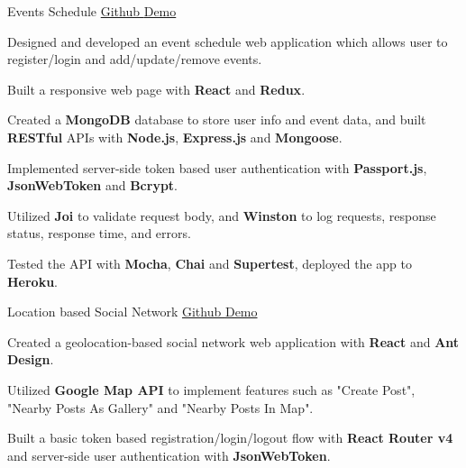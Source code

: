 \begin{cvprojects}
  \cvproject
    {Events Schedule}
    {\href{https://github.com/wuhxxx/event-schedule}{Github  }}
    {\href{https://event-schedule-app.herokuapp.com}{  Demo}}
    {
      \begin{cvitems}
        \item {Designed and developed an event schedule web application which allows user to register/login and add/update/remove events.}
        \item {Built a responsive web page with \textbf{React} and \textbf{Redux}.}
        \item {Created a \textbf{MongoDB} database to store user info and event data, and built \textbf{RESTful} APIs with \textbf{Node.js}, \textbf{Express.js} and \textbf{Mongoose}.}
        \item {Implemented server-side token based user authentication with \textbf{Passport.js}, \textbf{JsonWebToken} and \textbf{Bcrypt}.}
        \item {Utilized \textbf{Joi} to validate request body, and \textbf{Winston} to log requests, response status, response time, and errors.}
        \item {Tested the API with \textbf{Mocha}, \textbf{Chai} and \textbf{Supertest}, deployed the app to \textbf{Heroku}.}
      \end{cvitems}
    }
    
  \cvproject
    {Location based Social Network}
    {\href{https://github.com/wuhxxx/around}{Github  }}
    {\href{https://around-web.herokuapp.com}{  Demo}}
    {
      \begin{cvitems}
        \item {Created a geolocation-based social network web application with \textbf{React} and \textbf{Ant Design}.}
        \item {Utilized \textbf{Google Map API} to implement features such as "Create Post", "Nearby Posts As Gallery" and "Nearby Posts In Map".}
        \item {Built a basic token based registration/login/logout flow with \textbf{React Router v4} and server-side user authentication with \textbf{JsonWebToken}.}
      \end{cvitems}
    }


\end{cvprojects}
